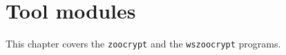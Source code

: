\chapter{Tool modules}

This chapter covers the \verb!zoocrypt! and the \verb!wszoocrypt! programs.
